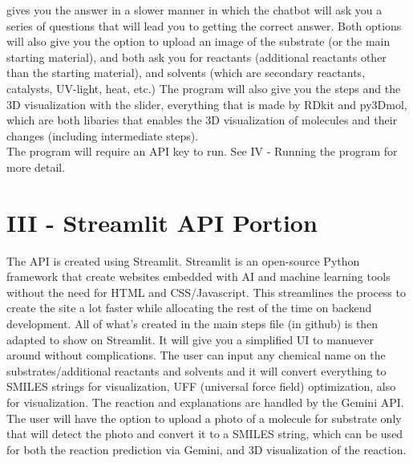 \documentclass{article}
\begin{document}
gives you the answer in a slower manner in which the chatbot will ask you a series of questions that will lead you to getting the correct answer.
Both options will also give you the option to upload an image of the substrate (or the main starting material), and both ask you for reactants (additional reactants other than the starting material), and solvents (which are secondary reactants, catalysts, UV-light, heat, etc.)
The program will also give you the steps and the 3D visualization with the slider, everything that is made by RDkit and py3Dmol, which are both libaries that enables the 3D visualization of molecules and their changes (including intermediate steps).
\\[2em]
The program will require an API key to run. See IV - Running the program for more detail.
\\[2em]

\section*{III - Streamlit API Portion}
The API is created using Streamlit. Streamlit is an open-source Python framework that create websites embedded with AI and machine learning tools without the need for HTML and CSS/Javascript. This streamlines the process to create the site a lot faster while allocating the rest of the time
on backend development. All of what's created in the main steps file (in github) is then adapted to show on Streamlit. It will give you a simplified UI to manuever around without complications. The user can input any chemical name on the substrates/additional reactants and solvents and it will convert everything to SMILES strings for visualization, UFF (universal force field) optimization,
also for visualization. The reaction and explanations are handled by the Gemini API. The user will have the option to upload a photo of a molecule for substrate only that will detect the photo and convert it to a SMILES string, which can be used for both the reaction prediction
via Gemini, and 3D visualization of the reaction.
\\[2em]
\end{document}
